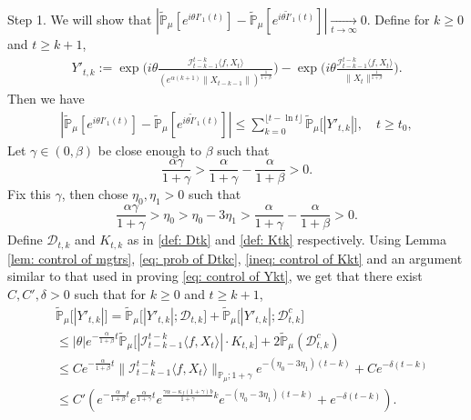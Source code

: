 \documentclass[12pt,a4paper]{amsart}
\theoremstyle{plain}
\theoremstyle{definition}
\numberwithin{equation}{section}
\begin{document}
    Step 1. We will show that $|\mathbb{\tilde{P}}_{\mu}[e^{i\theta I'_1(t)}]-\mathbb{\tilde{P}}_{\mu}[e^{i\theta\tilde I'_1(t)}]|\xrightarrow[t\to \infty]{} 0$.
    Define for $k\geq 0$ and $t\geq k+1$,
\begin{align*}
    Y'_{t,k}
    :=\exp\Big(i\theta\frac{\mathcal I_{t-k-1}^{t-k}\langle f ,X_t\rangle}{( e^{\alpha(k+1)}\|X_{t-k-1}\|)^{\frac{1}{1+\beta}}}\Big)-\exp\Big(i\theta\frac{\mathcal I_{t-k-1}^{t-k}\langle f ,X_t\rangle}{\|X_t\|^{\frac{1}{1+\beta}}}\Big).
\end{align*}
	Then we have
\begin{equation}\begin{split}
\label{ineq: control of I1tb}
    |\mathbb{\tilde{P}}_{\mu}[e^{i\theta I'_1(t)}] - \mathbb{\tilde{P}}_{\mu} [e^{i\theta\tilde{I}'_1(t)}]|
    \leq \sum_{k=0}^{\lfloor t-\ln t \rfloor}\mathbb{\tilde{P}}_{\mu}\big[|Y'_{t,k}|\big],
    \quad t\geq t_0,
\end{split}\end{equation}
    Let $\gamma \in (0,\beta)$ be close enough to $\beta$ such that
\[
    \frac{\alpha \gamma}{1+\gamma} > \frac{\alpha}{1+\gamma} - \frac{\alpha}{1+\beta} > 0.
\]
    Fix this $\gamma$, then chose $\eta_0,\eta_1>0$ such that
\[
    \frac{\alpha \gamma}{1+\gamma} >\eta_0 > \eta_0 - 3\eta_1 > \frac{\alpha}{1+\gamma} - \frac{\alpha}{1+\beta} > 0.
\]
	Define $\mathcal D_{t,k}$ and $K_{t,k}$ as in \eqref{def: Dtk} and \eqref{def: Ktk} respectively.
	Using Lemma \ref{lem: control of mgtrs}, \eqref{eq: prob of Dtkc}, \eqref{ineq: control of Kkt} and an argument similar to that used in proving \eqref{eq: control of Ykt}, we get that there exist $C,C',\delta>0$ such that for $k\geq 0$ and $t\geq k+1$,
\begin{align*}
    &\mathbb{\tilde{P}}_{\mu}\big[|Y'_{t,k}|\big]
    = \mathbb{\tilde{P}}_{\mu}\big[|Y'_{t,k}|; \mathcal D_{t,k}\big] + \mathbb{\tilde{P}}_{\mu}\big[|Y'_{t,k}|; \mathcal D_{t,k}^c \big]
    \\& \leq |\theta| e^{-\frac{\alpha}{1+\beta} t}\mathbb{\tilde{P}}_{\mu}\big[|\mathcal I_{t-k-1}^{t-k}\langle f ,X_t\rangle|\cdot K_{t,k}\big] + 2\mathbb{\tilde{P}}_{\mu}( \mathcal D_{t,k}^c )
    \\& \leq C e^{-\frac{\alpha}{1+\beta} t} \|\mathcal I_{t-k-1}^{t-k}\langle f, X_t\rangle \|_{\mathbb P_\mu; 1+\gamma}e^{-(\eta_0 - 3\eta_1)(t-k)} + Ce^{-\delta(t-k)}
    \\& \leq C'( e^{-\frac{\alpha}{1+\beta}t}e^{\frac{\alpha}{1+\gamma}t}e^{\frac{\gamma \alpha-\kappa_f(1+\gamma)b}{1+\gamma}k}e^{-(\eta_0 - 3\eta_1)(t-k)}+ e^{-\delta(t-k)}).
\end{align*}
\end{document}
